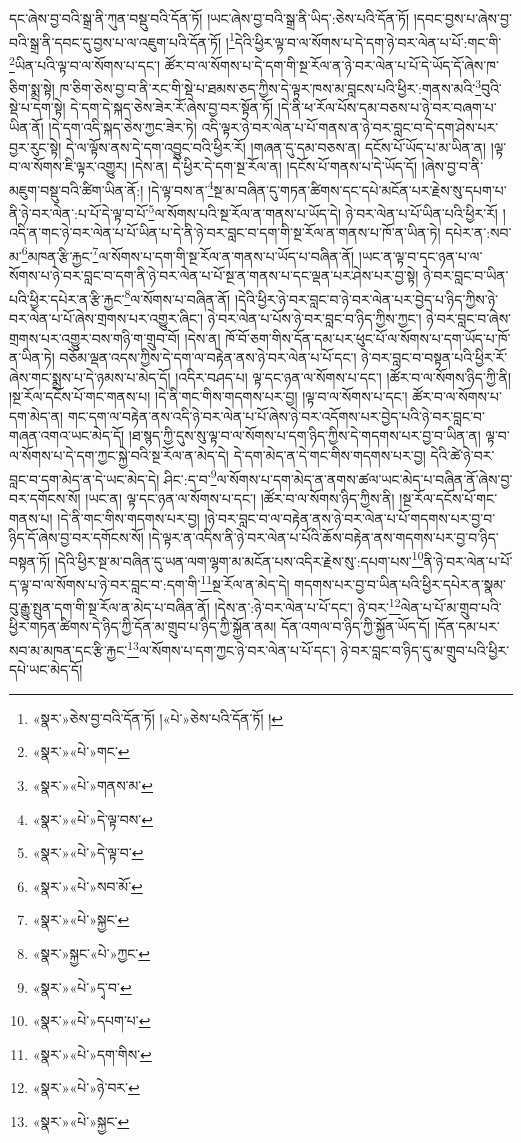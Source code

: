 དང་ཞེས་བྱ་བའི་སྒྲ་ནི་ཀུན་བསྡུ་བའི་དོན་ཏོ། །ཡང་ཞེས་བྱ་བའི་སྒྲ་ནི་ཡིད་:ཅེས་པའི་དོན་ཏོ། །དབང་བྱས་པ་ཞེས་བྱ་བའི་སྒྲ་ནི་དབང་དུ་བྱས་པ་ལ་འཇུག་པའི་དོན་ཏོ། །\footnote{«སྣར་»ཅེས་བྱ་བའི་དོན་ཏོ། །«པེ་»ཅེས་པའི་དོན་ཏོ། །}དེའི་ཕྱིར་ལྟ་བ་ལ་སོགས་པ་དེ་དག་ཉེ་བར་ལེན་པ་པོ་:གང་གི་\footnote{«སྣར་»«པེ་»གང་}ཡིན་པའི་ལྟ་བ་ལ་སོགས་པ་དང་། ཚོར་བ་ལ་སོགས་པ་དེ་དག་གི་སྔ་རོལ་ན་ཉེ་བར་ལེན་པ་པོ་དེ་ཡོད་དོ་ཞེས་ཁ་ཅིག་སྨྲ་སྟེ། ཁ་ཅིག་ཅེས་བྱ་བ་ནི་རང་གི་སྡེ་པ་ཐམས་ཅད་ཀྱིས་དེ་ལྟར་ཁས་མ་བླངས་པའི་ཕྱིར་:གནས་མའི་\footnote{«སྣར་»«པེ་»གནས་མ་}བུའི་སྡེ་པ་དག་སྟེ། དེ་དག་དེ་སྐད་ཅེས་ཟེར་རོ་ཞེས་བྱ་བར་སྟོན་ཏོ། །དེ་ནི་ཕ་རོལ་པོས་དམ་བཅས་པ་ཉེ་བར་བཞག་པ་ཡིན་ནོ། །དེ་དག་འདི་སྐད་ཅེས་ཀྱང་ཟེར་ཏེ། འདི་ལྟར་ཉེ་བར་ལེན་པ་པོ་གནས་ན་ཉེ་བར་བླང་བ་དེ་དག་ཤེས་པར་བྱར་རུང་སྟེ། དེ་ལ་ལྟོས་ནས་དེ་དག་འབྱུང་བའི་ཕྱིར་རོ། །གཞན་དུ་དམ་བཅས་ན། དངོས་པོ་ཡོད་པ་མ་ཡིན་ན། །ལྟ་བ་ལ་སོགས་ཇི་ལྟར་འགྱུར། །དེས་ན། དེ་ཕྱིར་དེ་དག་སྔ་རོལ་ན། །དངོས་པོ་གནས་པ་དེ་ཡོད་དོ། །ཞེས་བྱ་བ་ནི་མཇུག་བསྡུ་བའི་ཚིག་ཡིན་ནོ:། །དེ་ལྟ་བས་ན་\footnote{«སྣར་»«པེ་»དེ་ལྟ་བས་}སྔ་མ་བཞིན་དུ་གཏན་ཚིགས་དང་དཔེ་མངོན་པར་རྗེས་སུ་དཔག་པ་ནི་ཉེ་བར་ལེན་:པ་པོ་དེ་ལྟ་བ་པོ་\footnote{«སྣར་»«པེ་»དེ་ལྟ་བ་}ལ་སོགས་པའི་སྔ་རོལ་ན་གནས་པ་ཡོད་དེ། ཉེ་བར་ལེན་པ་པོ་ཡིན་པའི་ཕྱིར་རོ། །འདི་ན་གང་ཉེ་བར་ལེན་པ་པོ་ཡིན་པ་དེ་ནི་ཉེ་བར་བླང་བ་དག་གི་སྔ་རོལ་ན་གནས་པ་ཁོ་ན་ཡིན་ཏེ། དཔེར་ན་:སབ་མ་\footnote{«སྣར་»«པེ་»སབ་མོ་}མཁན་རྩི་རྐྱང་\footnote{«སྣར་»«པེ་»སྐྱང་}ལ་སོགས་པ་དག་གི་སྔ་རོལ་ན་གནས་པ་ཡོད་པ་བཞིན་ནོ། །ཡང་ན་ལྟ་བ་དང་ཉན་པ་ལ་སོགས་པ་ཉེ་བར་བླང་བ་དག་ནི་ཉེ་བར་ལེན་པ་པོ་སྔ་ན་གནས་པ་དང་ལྡན་པར་ཤེས་པར་བྱ་སྟེ། ཉེ་བར་བླང་བ་ཡིན་པའི་ཕྱིར་དཔེར་ན་རྩི་རྐྱང་\footnote{«སྣར་»སྐྱང་«པེ་»ཀྱང་}ལ་སོགས་པ་བཞིན་ནོ། །དེའི་ཕྱིར་ཉེ་བར་བླང་བ་ཉེ་བར་ལེན་པར་བྱེད་པ་ཉིད་ཀྱིས་ཉེ་བར་ལེན་པ་པོ་ཞེས་གྲགས་པར་འགྱུར་ཞིང་། ཉེ་བར་ལེན་པ་པོས་ཉེ་བར་བླང་བ་ཉིད་ཀྱིས་ཀྱང་། ཉེ་བར་བླང་བ་ཞེས་གྲགས་པར་འགྱུར་བས་གཉི་ག་གྲུབ་བོ། །དེས་ན། ཁོ་བོ་ཅག་གིས་དོན་དམ་པར་ཕུང་པོ་ལ་སོགས་པ་དག་ཡོད་པ་ཁོ་ན་ཡིན་ཏེ། བཅོམ་ལྡན་འདས་ཀྱིས་དེ་དག་ལ་བརྟེན་ནས་ཉེ་བར་ལེན་པ་པོ་དང་། ཉེ་བར་བླང་བ་བསྟན་པའི་ཕྱིར་རོ་ཞེས་གང་སྨྲས་པ་དེ་ཉམས་པ་མེད་དོ། །འདིར་བཤད་པ། ལྟ་དང་ཉན་ལ་སོགས་པ་དང་། །ཚོར་བ་ལ་སོགས་ཉིད་ཀྱི་ནི། །སྔ་རོལ་དངོས་པོ་གང་གནས་པ། །དེ་ནི་གང་གིས་གདགས་པར་བྱ། །ལྟ་བ་ལ་སོགས་པ་དང་། ཚོར་བ་ལ་སོགས་པ་དག་མེད་ན། གང་དག་ལ་བརྟེན་ནས་འདི་ཉེ་བར་ལེན་པ་པོ་ཞེས་ཉེ་བར་འདོགས་པར་བྱེད་པའི་ཉེ་བར་བླང་བ་གཞན་འགའ་ཡང་མེད་དོ། །ཐ་སྙད་ཀྱི་དུས་སུ་ལྟ་བ་ལ་སོགས་པ་དག་ཉིད་ཀྱིས་དེ་གདགས་པར་བྱ་བ་ཡིན་ན། ལྟ་བ་ལ་སོགས་པ་དེ་དག་ཀྱང་སྐྱེ་བའི་སྔ་རོལ་ན་མེད་དེ། དེ་དག་མེད་ན་དེ་གང་གིས་གདགས་པར་བྱ། དེའི་ཚེ་ཉེ་བར་བླང་བ་དག་མེད་ན་དེ་ཡང་མེད་དེ། ཤིང་:ད་བ་\footnote{«སྣར་»«པེ་»དྭ་བ་}ལ་སོགས་པ་དག་མེད་ན་ནགས་ཚལ་ཡང་མེད་པ་བཞིན་ནོ་ཞེས་བྱ་བར་དགོངས་སོ། །ཡང་ན། ལྟ་དང་ཉན་ལ་སོགས་པ་དང་། །ཚོར་བ་ལ་སོགས་ཉིད་ཀྱིས་ནི། །སྔ་རོལ་དངོས་པོ་གང་གནས་པ། །དེ་ནི་གང་གིས་གདགས་པར་བྱ། །ཉེ་བར་བླང་བ་ལ་བརྟེན་ནས་ཉེ་བར་ལེན་པ་པོ་གདགས་པར་བྱ་བ་ཉིད་དོ་ཞེས་བྱ་བར་དགོངས་སོ། །དེ་ལྟར་ན་འདིས་ནི་ཉེ་བར་ལེན་པ་པོའི་ཆོས་བརྟེན་ནས་གདགས་པར་བྱ་བ་ཉིད་བསྟན་ཏོ། །དེའི་ཕྱིར་སྔ་མ་བཞིན་དུ་ཡན་ལག་ལྷག་མ་མངོན་པས་འདིར་རྗེས་སུ་:དཔག་པས་\footnote{«སྣར་»«པེ་»དཔག་པ་}ནི་ཉེ་བར་ལེན་པ་པོ་ད་ལྟ་བ་ལ་སོགས་པ་ཉེ་བར་བླང་བ་:དག་གི་\footnote{«སྣར་»«པེ་»དག་གིས་}སྔ་རོལ་ན་མེད་དེ། གདགས་པར་བྱ་བ་ཡིན་པའི་ཕྱིར་དཔེར་ན་སྣམ་བུ་རྒྱུ་སྤུན་དག་གི་སྔ་རོལ་ན་མེད་པ་བཞིན་ནོ། །དེས་ན་:ཉེ་བར་ལེན་པ་པོ་དང་། ཉེ་བར་\footnote{«སྣར་»«པེ་»ཉེ་བར་}ལེན་པ་པོ་མ་གྲུབ་པའི་ཕྱིར་གཏན་ཚིགས་དེ་ཉིད་ཀྱི་དོན་མ་གྲུབ་པ་ཉིད་ཀྱི་སྐྱོན་ནམ། དོན་འགལ་བ་ཉིད་ཀྱི་སྐྱོན་ཡོད་དོ། །དོན་དམ་པར་སབ་མ་མཁན་དང་རྩི་རྐྱང་\footnote{«སྣར་»«པེ་»སྐྱང་}ལ་སོགས་པ་དག་ཀྱང་ཉེ་བར་ལེན་པ་པོ་དང་། ཉེ་བར་བླང་བ་ཉིད་དུ་མ་གྲུབ་པའི་ཕྱིར་དཔེ་ཡང་མེད་དོ། 